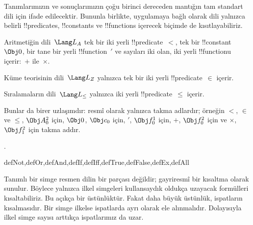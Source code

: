 \documentclass[../../../include/open-logic-section]{subfiles}
\begin{document}
Tanımlarımızın ve sonuçlarımızın çoğu birinci dereceden mantığın tam
standart dili için ifade edilecektir. Bununla birlikte, uygulamaya bağlı
olarak dili yalnızca belirli !!{predicate}s, !!{constant}s ve
!!{function}s içerecek biçimde de kısıtlayabiliriz.

\begin{ex}
Aritmetiğin dili~$\Lang L_A$ tek bir iki yerli !!{predicate}~$<$, tek
bir !!{constant}~$\Obj 0$, bir tane bir yerli !!{function}~$\prime$ ve
sayıları iki olan, iki yerli !!{function}{}u içerir:~$+$ ile~$\times$.
\end{ex}

\begin{ex}
Küme teorisinin dili~$\Lang L_Z$ yalnızca tek bir iki yerli
!!{predicate}~$\in$ içerir.
\end{ex}

\begin{ex}
Sıralamaların dili~$\Lang L_\le$ yalnızca iki yerli
!!{predicate}~$\le$ içerir.
\end{ex}

Bunlar da birer uzlaşımdır: resmî olarak yalnızca takma adlardır;
örneğin $<$, $\in$ ve $\le$, $\Obj A^2_0$ için, $\Obj 0$, $\Obj c_0$ için,
$\prime$, $\Obj f^1_0$ için, $+$, $\Obj f^2_0$ için ve $\times$,
$\Obj f^2_1$ için takma addır.

.

\begin{tagblock}{defNot,defOr,defAnd,defIf,defIff,defTrue,defFalse,defEx,defAll}
\begin{explain}
Tanımlı bir simge resmen dilin bir parçası değildir; gayriresmî bir
kısaltma olarak sunulur. Böylece yalnızca ilkel simgeleri kullansaydık
oldukça uzayacak formülleri kısaltabiliriz. Bu açıkça bir üstünlüktür.
Fakat daha büyük üstünlük, ispatların kısalmasıdır. Bir simge ilkelse
ispatlarda ayrı olarak ele alınmalıdır. Dolayısıyla ilkel simge sayısı
arttıkça ispatlarımız da uzar.
\end{explain}
\end{tagblock}
\end{document}
